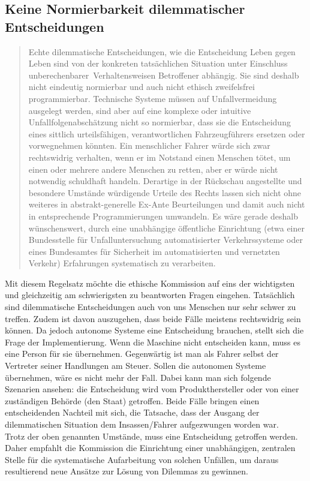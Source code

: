 \documentclass[twoside,a4paper,12pt]{article}
\begin{document}
\subsection{Keine Normierbarkeit dilemmatischer Entscheidungen} \label{NichtNormierbarkeitDilemmatischerEntscheidungen}
\begin{quote}
\glqq
Echte dilemmatische Entscheidungen, wie die Entscheidung Leben gegen Leben sind von
der konkreten tatsächlichen Situation unter Einschluss \glqq unberechenbarer\grqq\ Verhaltensweisen Betroffener abhängig. 
Sie sind deshalb nicht eindeutig normierbar und auch nicht
ethisch zweifelsfrei programmierbar. Technische Systeme müssen auf Unfallvermeidung
ausgelegt werden, sind aber auf eine komplexe oder intuitive Unfallfolgenabschätzung
nicht so normierbar, dass sie die Entscheidung eines sittlich urteilsfähigen, verantwortlichen Fahrzeugführers ersetzen 
oder vorwegnehmen könnten. Ein menschlicher Fahrer
würde sich zwar rechtswidrig verhalten, wenn er im Notstand einen Menschen tötet, um
einen oder mehrere andere Menschen zu retten, aber er würde nicht notwendig schuldhaft handeln. Derartige in der Rückschau 
angestellte und besondere Umstände würdigende Urteile des Rechts lassen sich nicht ohne weiteres in abstrakt-generelle 
Ex-Ante Beurteilungen und damit auch nicht in entsprechende Programmierungen umwandeln.
Es wäre gerade deshalb wünschenswert, durch eine unabhängige öffentliche Einrichtung
(etwa einer Bundesstelle für Unfalluntersuchung automatisierter Verkehrssysteme oder
eines Bundesamtes für Sicherheit im automatisierten und vernetzten Verkehr) Erfahrungen systematisch zu verarbeiten.\grqq\mbox{~\cite[S. 11]{ek}}
\end{quote}
Mit diesem Regelsatz möchte die ethische Kommission auf eins der wichtigsten und gleichzeitig am schwierigsten zu beantworten Fragen eingehen. Tatsächlich sind dilemmatische Entscheidungen auch von uns Menschen nur sehr schwer zu treffen. Zudem ist davon auszugehen, dass beide Fälle meistens rechtswidrig sein können.
Da jedoch autonome Systeme eine Entscheidung brauchen, stellt sich die Frage der Implementierung. Wenn die Maschine nicht entscheiden kann, muss es eine Person für sie übernehmen. Gegenwärtig ist man als Fahrer selbst der Vertreter seiner Handlungen am Steuer. Sollen die autonomen Systeme übernehmen, wäre es nicht mehr der Fall. Dabei kann man sich folgende Szenarien ansehen: die Entscheidung wird vom Produkthersteller oder von einer zuständigen Behörde (den Staat) getroffen. Beide Fälle bringen einen entscheidenden Nachteil mit sich, die Tatsache, dass der Ausgang der dilemmatischen Situation dem Insassen/Fahrer aufgezwungen worden war. \\
Trotz der oben genannten Umstände, muss eine Entscheidung getroffen werden. Daher empfahlt die Kommission die Einrichtung einer unabhängigen, zentralen Stelle für die systematische Aufarbeitung von solchen Unfällen, um daraus resultierend neue Ansätze zur Lösung von Dilemmas zu gewinnen.
\end{document}
